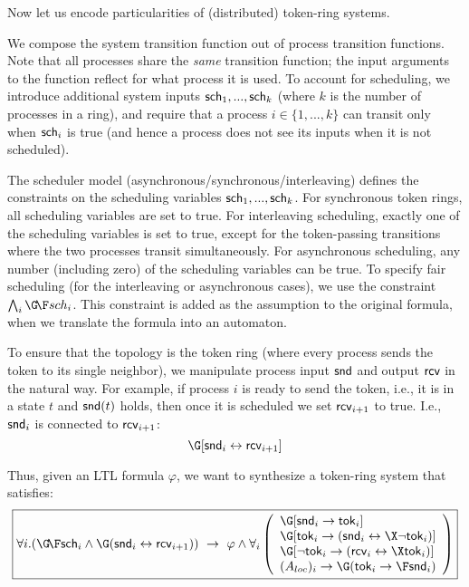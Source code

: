 \il

Now let us encode particularities of (distributed) token-ring systems.

\li

\- We compose the system transition function out of process transition functions.
   Note that all processes share the \emph{same} transition function;
   the input arguments to the function reflect for what process it is used.
   To account for scheduling,
   we introduce additional system inputs $\mathsf{sch}_1, ..., \mathsf{sch}_k$
   (where $k$ is the number of processes in a ring),
   and require that a process $i \in \{1,...,k\}$ can transit only when $\mathsf{sch}_i$ is true
   (and hence a process does not see its inputs when it is not scheduled).

\- The scheduler model (asynchronous/synchronous/interleaving) defines the constraints
   on the scheduling variables $\mathsf{sch}_1,...,\mathsf{sch}_k$.
   For synchronous token rings, all scheduling variables are set to true.
   For interleaving scheduling, exactly one of the scheduling variables is set to true,
   except for the token-passing transitions where the two processes transit simultaneously.
   For asynchronous scheduling, any number (including zero) of the scheduling variables can be true.
   To specify fair scheduling (for the interleaving or asynchronous cases),
   we use the constraint $\bigwedge_i \GF sch_i$.
   This constraint is added as the assumption to the original formula,
   when we translate the formula into an automaton.

\- To ensure that the topology is the token ring
   (where every process sends the token to its single neighbor),
   we manipulate process input $\mathsf{snd}$ and output $\mathsf{rcv}$ in the natural way.
   For example,
   if process $i$ is ready to send the token, i.e., it is in a state $t$ and $\mathsf{snd}(t)$ holds,
   then once it is scheduled we set $\mathsf{rcv}_{i+1}$ to true.
   I.e., $\mathsf{snd}_{i}$ is connected to $\mathsf{rcv}_{i+1}$:
   \begin{equation*}
   \G [\tsnd_i \iff \trcv_{i+1}]
   \end{equation*}
\il

Thus, given an LTL formula $\varphi$,
we want to synthesize a token-ring system that satisfies:
\begin{equation}\label{tok_rings:eq:full_formula}
\boxed{
\forall i. (\GF\sch_i \land \G(\tsnd_i \iff \trcv_{i+1}))
~\impl~
  \varphi \land \forall_i\left(
   \begin{array}{l}
     \G [\tsnd_i \impl \token_i] \\
     \G [\token_i \impl (\tsnd_i \iff \X\neg\token_i)] \\
     \G [\neg\token_i \impl (\trcv_i \iff \X\token_i)] \\
     (A_{loc})_i \impl \G(\token_i \impl \F \tsnd_i)
   \end{array}
   \right)
}
\end{equation}

